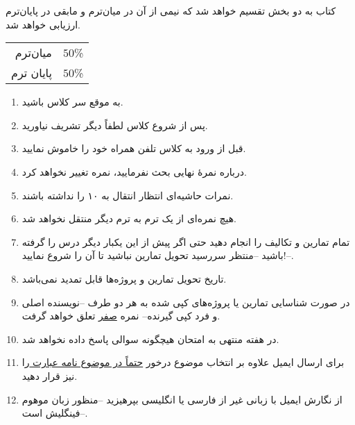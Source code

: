 \documentclass[10pt,a5paper,computeautoilg,pdfinfo=on]{unistyle}
\begin{document}
کتاب به دو بخش تقسیم خواهد شد که نیمی از آن در میان‌ترم و مابقی در پایان‌ترم ارزیابی خواهد شد.
\begin{RTLcases}\begin{tabular}{rl}
میان‌ترم & $50$\%   \\
پایان ترم & $50$\%
\end{tabular}\end{RTLcases}

\begin{multicols}{2}
\begin{enumerate}
\item به موقع سر کلاس باشید.
\item پس از شروع کلاس لطفاً دیگر تشریف نیاورید.
\item قبل از ورود به کلاس تلفن همراه خود را خاموش نمایید.
\item درباره نمرهٔ نهایی بحث نفرمایید، نمره تغییر نخواهد کرد.
\item نمرات حاشیه‌ای انتظار انتقال به ۱۰ را نداشته باشند.
\item هیچ نمره‌ای از یک ترم به ترم دیگر منتقل نخواهد شد.
\item تمام تمارین و تکالیف را انجام دهید حتی اگر پیش از این یکبار دیگر درس را گرفته‌ باشید --منتظر سررسید تحویل تمارین نباشید تا آن را شروع نمایید!--.
\item تاریخ تحویل تمارین و پروژه‌ها قابل تمدید نمی‌باشد.
\item در صورت شناسایی تمارین یا پروژه‌های کپی شده به هر دو طرف --نویسنده اصلی و فرد کپی گیرنده-- نمره \underline{صفر}   تعلق خواهد گرفت.
\item در هفته منتهی به امتحان هیچگونه سوالی پاسخ داده نخواهد شد.
\item برای ارسال ایمیل علاوه بر انتخاب موضوع درخور \underline{ حتماً در موضوع نامه عبارت \lr{[FLS2019]}} را نیز قرار دهید.
\item از نگارش ایمیل با زبانی غیر از فارسی یا انگلیسی بپرهیزید --منظور زبان موهوم فینگلیش است--.
\end{enumerate}
\end{multicols}


\vfill\kalamehakim
\xepersianproof
\end{document}
